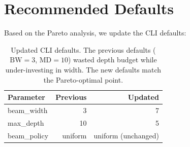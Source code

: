 \documentclass[11pt,a4paper]{article}
\begin{document}
\section{Recommended Defaults}

Based on the Pareto analysis, we update the CLI defaults:

\begin{table}[h]
\centering
\footnotesize
\begin{tabular}{lrr}
\toprule
\textbf{Parameter} & \textbf{Previous} & \textbf{Updated} \\
\midrule
beam\_width & 3 & 7 \\
max\_depth & 10 & 5 \\
beam\_policy & uniform & uniform (unchanged) \\
\bottomrule
\end{tabular}
\caption{Updated CLI defaults. The previous defaults ($\mathrm{BW}=3$, $\mathrm{MD}=10$) wasted depth budget while under-investing in width. The new defaults match the Pareto-optimal point.}
\end{table}
\end{document}
